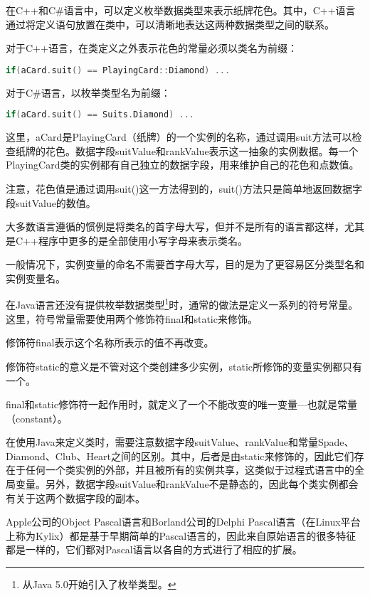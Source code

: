 在C++和C\#语言中，可以定义枚举数据类型来表示纸牌花色。其中，C++语言通过将定义语句放置在类中，可以清晰地表达这两种数据类型之间的联系。

对于C++语言，在类定义之外表示花色的常量必须以类名为前缀：

\begin{lstlisting}[language=C++]
if(aCard.suit() == PlayingCard::Diamond) ...
\end{lstlisting}

对于C\#语言，以枚举类型名为前缀：


\begin{lstlisting}[language=C++]
if(aCard.suit() == Suits.Diamond) ...
\end{lstlisting}

这里，aCard是PlayingCard（纸牌）的一个实例的名称，通过调用suit方法可以检查纸牌的花色。数据字段suitValue和rankValue表示这一抽象的实例数据。每一个PlayingCard类的实例都有自己独立的数据字段，用来维护自己的花色和点数值。

注意，花色值是通过调用suit()这一方法得到的，suit()方法只是简单地返回数据字段suitValue的数值。

大多数语言遵循的惯例是将类名的首字母大写，但并不是所有的语言都这样，尤其是C++程序中更多的是全部使用小写字母来表示类名。


一般情况下，实例变量的命名不需要首字母大写，目的是为了更容易区分类型名和实例变量名。


在Java语言还没有提供枚举数据类型\footnote{从Java 5.0开始引入了枚举类型。}时，通常的做法是定义一系列的符号常量。这里，符号常量需要使用两个修饰符final和static来修饰。

\begin{compactitem}
\item 修饰符final表示这个名称所表示的值不再改变。
\item 修饰符static的意义是不管对这个类创建多少实例，static所修饰的变量实例都只有一个。
\end{compactitem}

final和static修饰符一起作用时，就定义了一个不能改变的唯一变量—也就是常量（constant）。


在使用Java来定义类时，需要注意数据字段suitValue、rankValue和常量Spade、Diamond、Club、Heart之间的区别。其中，后者是由static来修饰的，因此它们存在于任何一个类实例的外部，并且被所有的实例共享，这类似于过程式语言中的全局变量。另外，数据字段suitValue和rankValue不是静态的，因此每个类实例都会有关于这两个数据字段的副本。

Apple公司的Object Pascal语言和Borland公司的Delphi Pascal语言（在Linux平台上称为Kylix）都是基于早期简单的Pascal语言的，因此来自原始语言的很多特征都是一样的，它们都对Pascal语言以各自的方式进行了相应的扩展。

